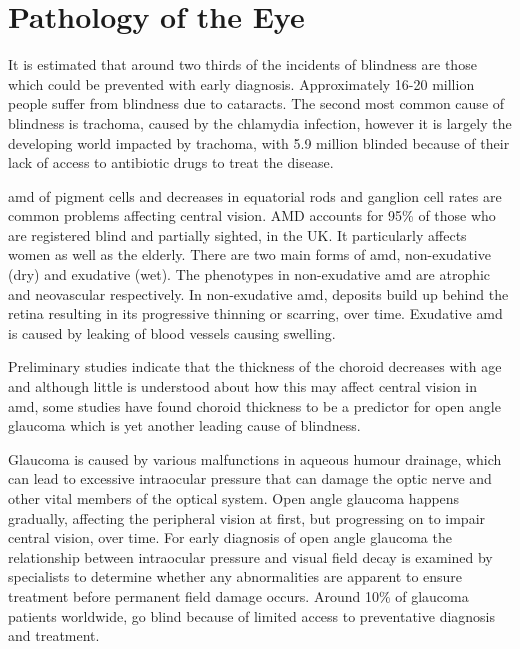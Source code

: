 \section{Pathology of the Eye}

It is estimated that around two thirds of the incidents of blindness are those
which could be prevented with early diagnosis.\cite{west2000looking}
Approximately 16-20 million people suffer from blindness due to
cataracts.\cite{west2000looking} The second most common cause of
blindness is trachoma, caused by the chlamydia infection, however it is
largely the developing world impacted by trachoma, with 5.9 million blinded
because of their lack of access to antibiotic drugs to treat the disease.
\cite{west2000looking}

\Gls{amd} of pigment cells and decreases in equatorial rods and ganglion cell
rates are common problems affecting central vision.\cite{gao1992aging}
AMD accounts for 95\% of those who are registered blind and partially sighted,
in the UK. It particularly affects women as well as the elderly.\cite{o1998age,klein2005complement,west2000looking}
There are two main forms of \acrshort{amd}, non-exudative (dry) and exudative
(wet). The phenotypes in non-exudative \acrshort{amd} are atrophic and
neovascular respectively.\cite{kuno2011dry} In non-exudative \acrshort{amd},
deposits build up behind the retina resulting in its progressive
thinning or scarring, over time. Exudative \acrshort{amd} is caused
by leaking of blood vessels causing swelling.

Preliminary studies indicate that the thickness of the choroid decreases
with age and although little is understood about how this may affect
central vision in \acrshort{amd}, some studies have found
choroid thickness to be a predictor for open angle glaucoma which
is yet another leading cause of blindness.\cite{margolis2009pilot,gordon2002ocular}

Glaucoma is caused by various malfunctions in aqueous humour
drainage, which can lead to excessive intraocular pressure that can
damage the optic nerve and other vital members of the optical system.
\cite{distelhorst2003open}
Open angle glaucoma happens gradually, affecting the peripheral vision
at first, but progressing on to impair central vision, over time. For early
diagnosis of open angle glaucoma the relationship between intraocular
pressure and visual field decay is examined by specialists to determine
whether any abnormalities are apparent to ensure treatment before
permanent field damage occurs.\cite{goldmann1972open} Around
10\% of glaucoma patients worldwide, go blind because of limited
access to preventative diagnosis and treatment.\cite{west2000looking}

